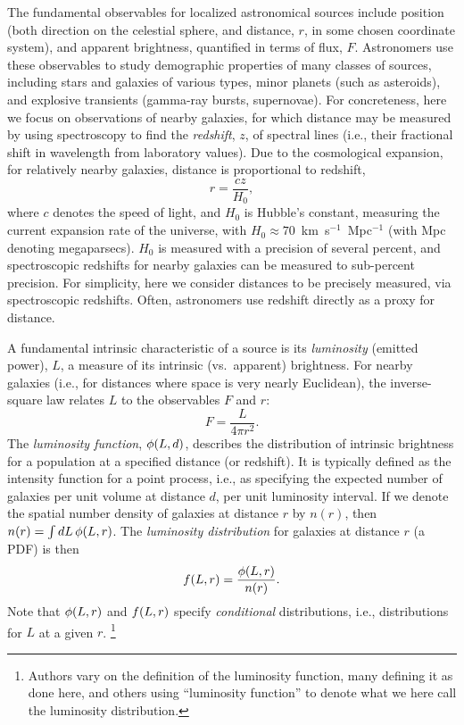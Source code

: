 The fundamental observables for localized astronomical sources include position (both direction on the celestial sphere, and distance, $r$, in some chosen coordinate system), and apparent brightness, quantified in terms of flux, $F$.
Astronomers use these observables to study demographic properties of many classes of sources, including stars and galaxies of various types, minor planets (such as asteroids), and explosive transients (gamma-ray bursts, supernovae).
For concreteness, here we focus on observations of nearby galaxies, for which distance may be measured by using spectroscopy to find the \emph{redshift}, $z$, of spectral lines (i.e., their fractional shift in wavelength from laboratory values).
Due to the cosmological expansion, for relatively nearby galaxies, distance is proportional to redshift,
\[
r = \frac{cz}{H_0},
\label{eq:r-z}
\]
where $c$ denotes the speed of light, and $H_0$ is Hubble's constant, measuring the current expansion rate of the universe, with $H_0 \approx 70$~km~s$^{-1}$~Mpc$^{-1}$ (with Mpc denoting megaparsecs).
$H_0$ is measured with a precision of several percent, and spectroscopic redshifts for nearby galaxies can be measured to sub-percent precision.
For simplicity, here we consider distances to be precisely measured, via spectroscopic redshifts.
Often, astronomers use redshift directly as a proxy for distance.

A fundamental intrinsic characteristic of a source is its \emph{luminosity} (emitted power), $L$, a measure of its intrinsic (vs.\ apparent) brightness.
For nearby galaxies (i.e., for distances where space is very nearly Euclidean), the inverse-square law relates $L$ to the observables $F$ and $r$:
\[
F=\frac{L}{4\pi r^2}.
\label{eq:inv-sqr}
\]
The \emph{luminosity function}, $\phi(L, d)$, describes the distribution of intrinsic brightness for a population at a specified distance (or redshift).
It is typically defined as the intensity function for a point process, i.e., as specifying the expected number of galaxies per unit volume at distance $d$, per unit luminosity interval.
If we denote the spatial number density of galaxies at distance $r$ by $n(r)$, then $n(r) = \int dL\, \phi(L, r)$.
The \emph{luminosity distribution} for galaxies at distance $r$ (a PDF) is then
\[
f(L,r) = \frac{\phi(L, r)}{n(r)}.
\label{eq:lpdf}
\]
Note that $\phi(L,r)$ and $f(L,r)$ specify \emph{conditional} distributions, i.e., distributions for $L$ at a given $r$.%
\footnote{Authors vary on the definition of the luminosity function, many defining it as done here, and others using ``luminosity function'' to denote what we here call the luminosity distribution.}

